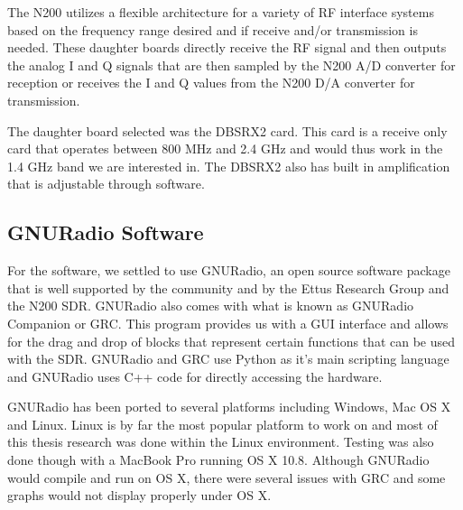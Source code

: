 The N200 utilizes a flexible architecture for a variety of RF interface systems based on the frequency range desired and if receive and/or transmission is needed.  These daughter boards directly receive the RF signal and then outputs the analog I and Q signals that are then sampled by the N200 A/D converter for reception or receives the I and Q values from the N200 D/A converter for transmission.  

The daughter board selected was the DBSRX2 card.  This card is a receive only card that operates between 800 MHz and 2.4 GHz and would thus work in the 1.4 GHz band we are interested in.  The DBSRX2 also has built in amplification that is adjustable through software.




\subsection{GNURadio Software}

For the software, we settled to use GNURadio, an open source software package that is well supported by the community and by the Ettus Research Group and the N200 SDR.  GNURadio also comes with what is known as GNURadio Companion or GRC.  This program provides us with a GUI interface and allows for the drag and drop of blocks that represent certain functions that can be used with the SDR.  GNURadio and GRC use Python as it's main scripting language and GNURadio uses C++ code for directly accessing the hardware.  

GNURadio has been ported to several platforms including Windows, Mac OS X and Linux.  Linux is by far the most popular platform to work on and most of this thesis research was done within the Linux environment.  Testing was also done though with a MacBook Pro running OS X 10.8.  Although GNURadio would compile and run on OS X, there were several issues with GRC and some graphs would not display properly under OS X.  

